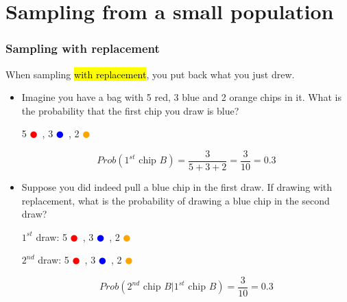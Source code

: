 \section{Sampling from a small population}


\begin{frame}
\frametitle{Sampling with replacement}

When sampling \hl{with replacement}, you put back what you just drew.

\pause

\begin{itemize}

\item Imagine you have a bag with 5 red, 3 blue and 2 orange chips in it. What is the probability that the first chip you draw is blue?
\begin{center}
5 \textcolor{red}{$\CIRCLE$}~, 3 \textcolor{blue}{$\CIRCLE$}~, 2 \textcolor{orange}{$\CIRCLE$}
\end{center}

\pause

\[ Prob(1^{st} \text{ chip } B) = \frac{3}{5 + 3 + 2} = \frac{3}{10} = 0.3 \]

\pause

\item Suppose you did indeed pull a blue chip in the first draw. If drawing with replacement, what is the probability of drawing a blue chip in the second draw?

\pause

\begin{center}
$1^{st}$ draw: 5 \textcolor{red}{$\CIRCLE$}~, 3 \textcolor{blue}{$\CIRCLE$}~, 2 \textcolor{orange}{$\CIRCLE$} \\

\pause

$2^{nd}$ draw: 5 \textcolor{red}{$\CIRCLE$}~, 3 \textcolor{blue}{$\CIRCLE$}~, 2 \textcolor{orange}{$\CIRCLE$}
\end{center}

\pause

\[ Prob(2^{nd} \text{ chip } B | 1^{st} \text{ chip } B) = \frac{3}{10} = 0.3 \]

\end{itemize}

\end{frame}



